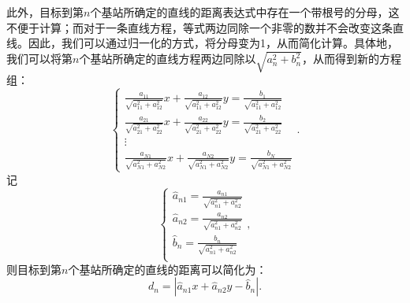 此外，目标到第\( n \)个基站所确定的直线的距离表达式中存在一个带根号的分母，这不便于计算；而对于一条直线方程，等式两边同除一个非零的数并不会改变这条直线。因此，我们可以通过归一化的方式，将分母变为1，从而简化计算。具体地，我们可以将第\( n \)个基站所确定的直线方程两边同除以\( \sqrt{a_n^2 + b_n^2} \)，从而得到新的方程组：
\[
    \begin{cases}
        \frac{a_{11}}{\sqrt{a_{11}^2 + a_{12}^2}} x + \frac{a_{12}}{\sqrt{a_{11}^2 + a_{12}^2}} y = \frac{b_1}{\sqrt{a_{11}^2 + a_{12}^2}} \\
        \frac{a_{21}}{\sqrt{a_{21}^2 + a_{22}^2}} x + \frac{a_{22}}{\sqrt{a_{21}^2 + a_{22}^2}} y = \frac{b_2}{\sqrt{a_{21}^2 + a_{22}^2}} \\
        \vdots                                                                                                                             \\
        \frac{a_{N1}}{\sqrt{a_{N1}^2 + a_{N2}^2}} x + \frac{a_{N2}}{\sqrt{a_{N1}^2 + a_{N2}^2}} y = \frac{b_N}{\sqrt{a_{N1}^2 + a_{N2}^2}}
    \end{cases}.
\]
记
\[
    \begin{cases}
        \hat{a}_{n1} = \frac{a_{n1}}{\sqrt{a_{n1}^2 + a_{n2}^2}} \\
        \hat{a}_{n2} = \frac{a_{n2}}{\sqrt{a_{n1}^2 + a_{n2}^2}} \\
        \hat{b}_n = \frac{b_n}{\sqrt{a_{n1}^2 + a_{n2}^2}}       \\
    \end{cases},
\]
则目标到第\( n \)个基站所确定的直线的距离可以简化为：
\[
    d_n = |\hat{a}_{n1} x + \hat{a}_{n2} y - \hat{b}_n|.
\]


